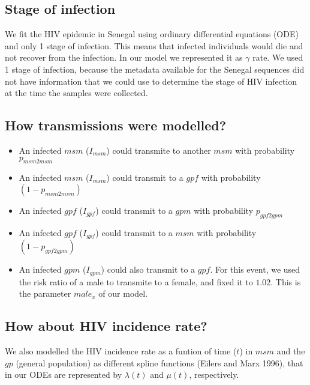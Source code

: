 \documentclass[12pt,]{article}
\providecommand{\tightlist}{%
  \setlength{\itemsep}{0pt}\setlength{\parskip}{0pt}}
\begin{document}
\hypertarget{stage-of-infection}{%
\subsection{Stage of infection}\label{stage-of-infection}}

We fit the HIV epidemic in Senegal using ordinary differential equations
(ODE) and only 1 stage of infection. This means that infected
individuals would die and not recover from the infection. In our model
we represented it as \(\gamma\) rate. We used 1 stage of infection,
because the metadata available for the Senegal sequences did not have
information that we could use to determine the stage of HIV infection at
the time the samples were collected.

\hypertarget{how-transmissions-were-modelled}{%
\subsection{How transmissions were
modelled?}\label{how-transmissions-were-modelled}}

\begin{itemize}
\tightlist
\item
  An infected \(msm\) (\(I_{msm}\)) could transmite to another \(msm\)
  with probability \(p_{msm2msm}\)
\item
  An infected \(msm\) (\(I_{msm}\)) could transmit to a \(gpf\) with
  probability \((1 - p_{msm2msm})\)
\item
  An infected \(gpf\) (\(I_{gpf}\)) could transmit to a \(gpm\) with
  probability \(p_{gpf2gpm}\)
\item
  An infected \(gpf\) (\(I_{gpf}\)) could transmit to a \(msm\) with
  probability \((1 - p_{gpf2gpm})\)
\item
  An infected \(gpm\) (\(I_{gpm}\)) could also transmit to a \(gpf\).
  For this event, we used the risk ratio of a male to transmite to a
  female, and fixed it to \(1.02\). This is the parameter \(male_{x}\)
  of our model.
\end{itemize}

\hypertarget{how-about-hiv-incidence-rate}{%
\subsection{How about HIV incidence
rate?}\label{how-about-hiv-incidence-rate}}

We also modelled the HIV incidence rate as a funtion of time (\(t\)) in
\(msm\) and the \(gp\) (general population) as different spline
functions (Eilers and Marx 1996), that in our ODEs are represented by
\(\lambda(t)\) and \(\mu(t)\), respectively.
\end{document}
